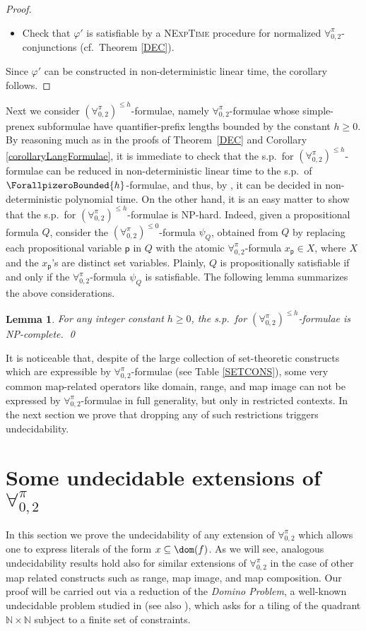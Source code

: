 \documentclass[submission,copyright,creativecommons]{eptcs}
\newtheorem{lemma}{Lemma}
\newcommand{\Lang}{\ensuremath{\mathbf{\forall}^{\pi}_{0,2}}\xspace}
\newcommand{\LangBounded}[1]{\ensuremath{(\Lang)^{\leq #1}}\xspace}
\newcommand{\nat}{\mathbb{N}}
\newcommand{\corr}[1]{#1}
\begin{document}
\begin{proof}
\begin{itemize}
    \item Check that $\varphi'$ is satisfiable by a 
    \textsc{NExpTime} procedure for normalized \Lang-conjunctions 
    (cf.\ Theorem \ref{DEC}).
\end{itemize}
Since $\varphi'$ can be constructed in non-deterministic linear time, 
the corollary follows.
\end{proof}


Next we consider \LangBounded{h}-formulae, namely \Lang-formulae whose
simple-prenex subformulae have \corr{quantifier-prefix lengths} bounded by
the constant $h\geq 0$.
By reasoning much as in the proofs of Theorem~\ref{DEC} and Corollary
\ref{corollaryLangFormulae}, it is immediate to check that the s.p.\
for \LangBounded{h}-formulae can be reduced in non-deterministic
linear time to the s.p.\ of $\ForallpizeroBounded{h}$-formulae, and
thus, by \cite[Corollary~4]{CanLonNic2011}, it can be decided in
non-deterministic polynomial time.
On the other hand, it is an easy matter to show that the s.p.\ for
\LangBounded{h}-formulae is \textsc{NP}-hard.  Indeed, given a
propositional formula $Q$, consider the \LangBounded{0}-formula
$\psi_{Q}$, obtained from $Q$ by replacing each propositional variable
$\mathsf{p}$ in $Q$ with the atomic \Lang-formula $x_{\mathsf{p}} \in
X$, where $X$ and the $x_{\mathsf{p}}$'s are distinct set variables.
Plainly, $Q$ is propositionally satisfiable if and only if the
\Lang-formula $\psi_{Q}$ is satisfiable.
The following lemma summarizes the above considerations.

\begin{lemma}\label{NP}
For any integer constant $h \geq 0$, the s.p.\ for
\LangBounded{h}-formulae is \textsc{NP}-complete.  \qed
\end{lemma}

It is noticeable that, despite of the large collection of
set-theoretic constructs which are expressible by \Lang-formulae (see
Table \ref{SETCONS}), some very common map-related operators like
domain, range, and map image can not be expressed by \Lang-formulae in
full generality, but only in restricted contexts.  In the next section
we prove that dropping any of such restrictions triggers
undecidability.

\section{Some undecidable extensions of \Lang}\label{UNDEC}

In this section we prove the undecidability of any extension of \Lang
which allows one to express literals of the form $x \subseteq
\dom(f)$.  As we will see, analogous undecidability results hold also
for similar extensions of \Lang in the case of other map related
constructs such as range, map image, and map composition.
Our proof will be carried out via a reduction of the \emph{Domino
Problem}, a well-known undecidable problem studied in \cite{Ber1966}
\corr{(see also \cite{BorGraGur1997})},
which asks for a tiling of the quadrant $\nat \times \nat$ subject to
a finite set of constraints.
\end{document}
